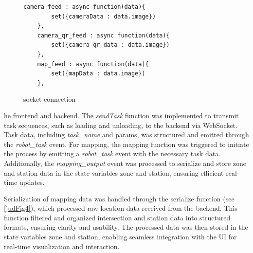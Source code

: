 \documentclass[a4paper,12pt]{extreport}
\begin{document}
\begin{figure}
  \begin{verbatim}
camera_feed : async function(data){
        set({cameraData : data.image})
    },
    camera_qr_feed : async function(data){
        set({camera_qr_data : data.image})
    },
    map_feed : async function(data){
        set({mapData : data.image})
    },
\end{verbatim}
\caption{socket connection}
\end{figure}
he frontend and backend. The \emph{sendTask} function was
implemented to transmit task sequences, such as loading and unloading,
to the backend via WebSocket. Task data, including \emph{task\_name} and
params, was structured and emitted through the \emph{robot\_task} event.
For mapping, the mapping function was triggered to initiate the process
by emitting a \emph{robot\_task} event with the necessary task data.
Additionally, the \emph{mapping\_output} event was processed to
serialize and store zone and station data in the state variables zone
and station, ensuring efficient real-time updates.

Serialization of mapping data was handled through the serialize function
(see \cref{judFig4}), which processed raw location data received from the
backend. This function filtered and organized intersection and station
data into structured formats, ensuring clarity and usability. The
processed data was then stored in the state variables zone and station,
enabling seamless integration with the UI for real-time visualization
and interaction.
\end{document}
